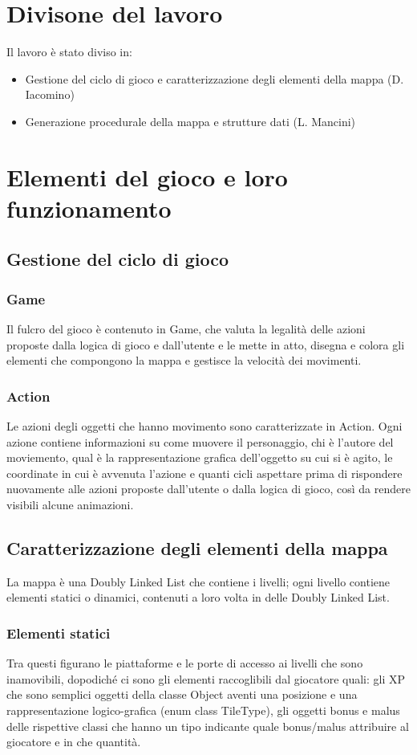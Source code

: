 \documentclass[12pt]{article}
\begin{document}
\section*{Divisone del lavoro}
Il lavoro è stato diviso in:
\begin{itemize}
    \item Gestione del ciclo di gioco e caratterizzazione degli elementi della mappa (D. Iacomino)
    \item Generazione procedurale della mappa e strutture dati (L. Mancini)
\end{itemize}

\section*{Elementi del gioco e loro funzionamento}
\subsection*{Gestione del ciclo di gioco}
\subsubsection{Game}
Il fulcro del gioco è contenuto in Game, che valuta la legalità delle azioni proposte dalla logica di gioco e dall'utente e le mette in atto, disegna e colora gli elementi che compongono la mappa e gestisce la velocità dei movimenti.
\subsubsection{Action}
Le azioni degli oggetti che hanno movimento sono caratterizzate in Action. Ogni azione contiene informazioni su come muovere il personaggio, chi è l'autore del moviemento, qual è la rappresentazione grafica dell'oggetto su cui si è agito, le coordinate in cui è avvenuta l'azione e quanti cicli aspettare prima di rispondere nuovamente alle azioni proposte dall'utente o dalla logica di gioco, così da rendere visibili alcune animazioni.
\pagebreak

\subsection{Caratterizzazione degli elementi della mappa}
La mappa è una Doubly Linked List che contiene i livelli; ogni livello contiene elementi statici o dinamici, contenuti a loro volta in delle Doubly Linked List.

\subsubsection{Elementi statici}
Tra questi figurano le piattaforme e le porte di accesso ai livelli che sono inamovibili, dopodiché ci sono gli elementi raccoglibili dal giocatore quali: gli XP che sono semplici oggetti della classe Object aventi una posizione e una rappresentazione logico-grafica (enum class TileType), gli oggetti bonus e malus delle rispettive classi che hanno un tipo indicante quale bonus/malus attribuire al giocatore e in che quantità.
\end{document}

